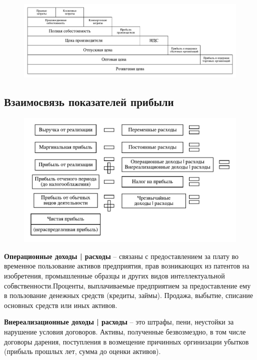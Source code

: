 \begin{figure}[H]
    \centering
    \includegraphics[scale=0.5]{img/cost.pdf}
\end{figure}

\subsection{Взаимосвязь показателей прибыли}

\begin{figure}[H]
    \centering
    \includegraphics[scale=0.8]{img/relationship.pdf}
\end{figure}

\textbf{Операционные доходы | расходы} -- связаны с предоставлением за плату во временное пользование активов предприятия, прав возникающих из патентов на изобретения, промышленные образцы и других видов интеллектуальной собвственности.Проценты, выплачиваемые предприятием за предоставление ему в пользование денежных средств (кредиты, займы). Продажа, выбытие, списание основных средств или иных активов.

\textbf{Внереализационные доходы | расходы} -- это штрафы, пени, неустойки за нарушение условия договоров. Активы, полученные безвозмездно, в том числе договоры дарения, поступления в возмещение причинных оргинизации убытков (прибыль прошлых лет, сумма до оценки активов).

